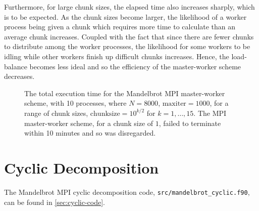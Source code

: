 \documentclass{article}
\begin{document}
Furthermore, for large chunk sizes, the elapsed time also increases sharply,
which is to be expected.
As the chunk sizes become larger, the likelihood of a worker process being given
a chunk which requires more time to calculate than an average chunk increases.
Coupled with the fact that since there are fewer chunks to distribute among the
worker processes, the likelihood for some workers to be idling while other
workers finish up difficult chunks increases.
Hence, the load-balance becomes less ideal and so the efficiency of the
master-worker scheme decreases.
\begin{figure}[h]
  \centering
  \caption{The total execution time for the Mandelbrot MPI master-worker scheme,
  with 10 processes, where $N=8000$, $\mathrm{maxiter}=1000$, for a range of
  chunk sizes, $\mathrm{chunksize} = 10^{k/2}$ for $k = 1, \dotsc, 15$. The MPI
  master-worker scheme, for a chunk size of $1$, failed to terminate within
  10 minutes and so was disregarded.}
  \label{fig:scaling-chunksize}
\end{figure}

\clearpage
\section{Cyclic Decomposition}
\label{sec:cyclic}

The Mandelbrot MPI cyclic decomposition code,
\lstinline[style=ff]{src/mandelbrot_cyclic.f90}, can be found in
\autoref{sec:cyclic-code}.
\end{document}

